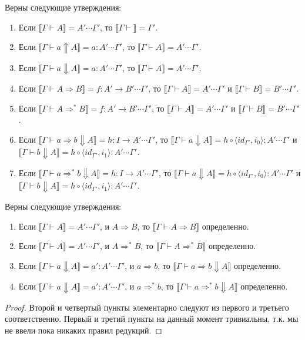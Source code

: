 \documentclass{amsart}
\theoremstyle{definition}
\theoremstyle{remark}
\newcommand{\red}{\Rightarrow}
\renewcommand{\ll}{\llbracket}
\newcommand{\rr}{\rrbracket}
\numberwithin{figure}{section}
\begin{document}
\begin{lem}
Верны следующие утверждения:
\begin{enumerate}
\item Если $\ll \Gamma \vdash A \rr = A' \dotsb \Gamma'$, то $\ll \Gamma \vdash \rr = \Gamma'$.
\item Если $\ll \Gamma \vdash a \Uparrow A \rr = a : A' \dotsb \Gamma'$, то $\ll \Gamma \vdash A \rr = A' \dotsb \Gamma'$.
\item Если $\ll \Gamma \vdash a \Downarrow A \rr = a : A' \dotsb \Gamma'$, то $\ll \Gamma \vdash A \rr = A' \dotsb \Gamma'$.
\item Если $\ll \Gamma \vdash A \red B \rr = f : A' \to B' \dotsb \Gamma'$, то $\ll \Gamma \vdash A \rr = A' \dotsb \Gamma'$ и $\ll \Gamma \vdash B \rr = B' \dotsb \Gamma'$.
\item Если $\ll \Gamma \vdash A \red^* B \rr = f : A' \to B' \dotsb \Gamma'$, то $\ll \Gamma \vdash A \rr = A' \dotsb \Gamma'$ и $\ll \Gamma \vdash B \rr = B' \dotsb \Gamma'$.
\item Если $\ll \Gamma \vdash a \red b \Downarrow A \rr = h : I \to A' \dotsb \Gamma'$, то $\ll \Gamma \vdash a \Downarrow A \rr = h \circ \langle id_{\Gamma'}, i_0 \rangle : A' \dotsb \Gamma'$ и $\ll \Gamma \vdash b \Downarrow A \rr = h \circ \langle id_{\Gamma'}, i_1 \rangle : A' \dotsb \Gamma'$.
\item Если $\ll \Gamma \vdash a \red^* b \Downarrow A \rr = h : I \to A' \dotsb \Gamma'$, то $\ll \Gamma \vdash a \Downarrow A \rr = h \circ \langle id_{\Gamma'}, i_0 \rangle : A' \dotsb \Gamma'$ и $\ll \Gamma \vdash b \Downarrow A \rr = h \circ \langle id_{\Gamma'}, i_1 \rangle : A' \dotsb \Gamma'$.
\end{enumerate}
\end{lem}

\begin{lem}
Верны следующие утверждения:
\begin{enumerate}
\item Если $\ll \Gamma \vdash A \rr = A' \dotsb \Gamma'$, и $A \red B$, то $\ll \Gamma \vdash A \red B \rr$ определенно.
\item Если $\ll \Gamma \vdash A \rr = A' \dotsb \Gamma'$, и $A \red^* B$, то $\ll \Gamma \vdash A \red^* B \rr$ определенно.
\item Если $\ll \Gamma \vdash a \Downarrow A \rr = a' : A' \dotsb \Gamma'$, и $a \red b$, то $\ll \Gamma \vdash a \red b \Downarrow A \rr$ определенно.
\item Если $\ll \Gamma \vdash a \Downarrow A \rr = a' : A' \dotsb \Gamma'$, и $a \red^* b$, то $\ll \Gamma \vdash a \red^* b \Downarrow A \rr$ определенно.
\end{enumerate}
\end{lem}
\begin{proof}
Второй и четвертый пункты элементарно следуют из первого и третьего соответственно.
Первый и третий пункты на данный момент тривиальны, т.к. мы не ввели пока никаких правил редукций.
\end{proof}
\end{document}
